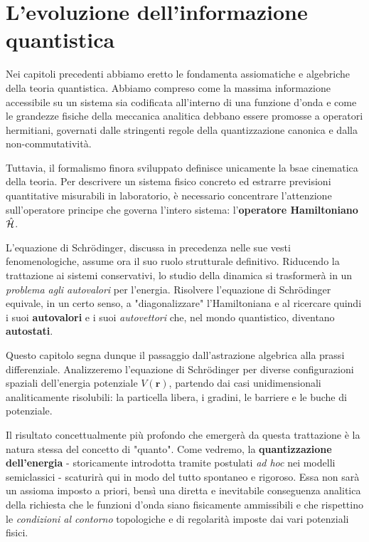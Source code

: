 \chapter{L'evoluzione dell'informazione quantistica}
Nei capitoli precedenti abbiamo eretto le fondamenta assiomatiche e algebriche della teoria quantistica. Abbiamo compreso come la massima informazione accessibile su un sistema sia codificata all'interno di una funzione d'onda e come le grandezze fisiche della meccanica analitica debbano essere promosse a operatori hermitiani, governati dalle stringenti regole della quantizzazione canonica e dalla non-commutatività. 

Tuttavia, il formalismo finora sviluppato definisce unicamente la bsae cinematica della teoria. Per descrivere un sistema fisico concreto ed estrarre previsioni quantitative misurabili in laboratorio, è necessario concentrare l'attenzione sull'operatore principe che governa l'intero sistema: l'\textbf{operatore Hamiltoniano} $\hat{\mathcal{H}}$.

L'equazione di Schrödinger, discussa in precedenza nelle sue vesti fenomenologiche, assume ora il suo ruolo strutturale definitivo. Riducendo la trattazione ai sistemi conservativi, lo studio della dinamica si trasformerà in un \emph{problema agli autovalori} per l'energia. Risolvere l'equazione di Schrödinger equivale, in un certo senso, a "diagonalizzare" l'Hamiltoniana e al ricercare quindi i suoi \textbf{autovalori} e i suoi \emph{autovettori} che, nel mondo quantistico, diventano \textbf{autostati}.

Questo capitolo segna dunque il passaggio dall'astrazione algebrica alla prassi differenziale. Analizzeremo l'equazione di Schrödinger per diverse configurazioni spaziali dell'energia potenziale $V(\bm{r})$, partendo dai casi unidimensionali analiticamente risolubili: la particella libera, i gradini, le barriere e le buche di potenziale.

Il risultato concettualmente più profondo che emergerà da questa trattazione è la natura stessa del concetto di "quanto". Come vedremo, la \textbf{quantizzazione dell'energia} - storicamente introdotta tramite postulati \emph{ad hoc} nei modelli semiclassici - scaturirà qui in modo del tutto spontaneo e rigoroso. Essa non sarà un assioma imposto a priori, bensì una diretta e inevitabile conseguenza analitica della richiesta che le funzioni d'onda siano fisicamente ammissibili e che rispettino le \emph{condizioni al contorno} topologiche e di regolarità imposte dai vari potenziali fisici.

